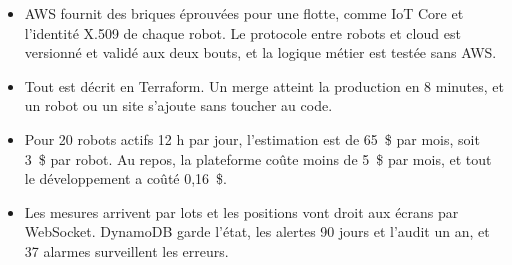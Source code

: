 \documentclass[9pt,a4paper]{extarticle}
\begin{document}
\noindent\begin{minipage}[t]{0.485\linewidth}\vspace{0pt}
  \fontsize{8.5}{10.3}\selectfont
  \begin{itemize}
    \item AWS fournit des briques éprouvées pour une flotte, comme IoT Core et l'identité X.509 de chaque robot. Le protocole entre robots et cloud est versionné et validé aux deux bouts, et la logique métier est testée sans AWS.
    \item Tout est décrit en Terraform. Un merge atteint la production en 8 minutes, et un robot ou un site s'ajoute sans toucher au code.
    \item Pour 20 robots actifs 12 h par jour, l'estimation est de 65~\$ par mois, soit 3~\$ par robot. Au repos, la plateforme coûte moins de 5~\$ par mois, et tout le développement a coûté 0,16~\$.
    \item Les mesures arrivent par lots et les positions vont droit aux écrans par WebSocket. DynamoDB garde l'état, les alertes 90 jours et l'audit un an, et 37 alarmes surveillent les erreurs.
  \end{itemize}
\end{minipage}\hfill
\begin{minipage}[t]{0.485\linewidth}\vspace{0pt}
  \begin{choixtable}
  \end{choixtable}
\end{minipage}

\end{document}
